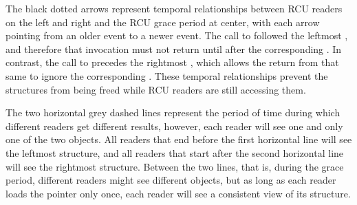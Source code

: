 The black dotted arrows represent temporal relationships between RCU readers
on the left and right and the RCU grace period at center, with each
arrow pointing from an older event to a newer event.
The call to  followed the leftmost ,
and therefore that  invocation must not return
until after the corresponding .
In contrast, the call to  precedes the
rightmost , which allows the return from that same
 to ignore the corresponding .
These temporal relationships prevent the  structures from
being freed while RCU readers are still accessing them.

The two horizontal grey dashed lines represent the period of time during
which different readers get different results, however, each reader
will see one and only one of the two objects.
All readers that end before the first horizontal line will see the
leftmost  structure, and all readers that start after the
second horizontal line will see the rightmost structure.
Between the two lines, that is, during the grace period, different
readers might see different objects, but as long as each reader
loads the  pointer only once, each reader will see
a consistent view of its  structure.

\QuickQuizEnd

